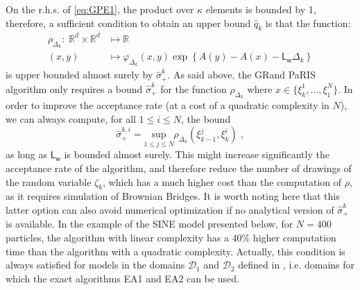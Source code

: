\documentclass[12pt]{article}
\newcommand{\eqsp}{\;}
\newcommand{\1}{\mathrm{1}}
\newcommand{\mw}{\mathsf{w}}%
\newcommand{\Lo}{\mathsf{L}}
\begin{document}
On the r.h.s. of \eqref{eq:GPE1}, the product over $\kappa$ elements is bounded by 1, therefore, a sufficient condition to obtain an upper bound  $\hat{q}_k$ is that the function:
\begin{align}
\rho_{\Delta_k}:\eqsp\mathbb{R}^d\times \mathbb{R}^d &\mapsto \mathbb{R}\nonumber\\
(x,y)&\mapsto \varphi_{\Delta_k}(x,y) \exp \left\{A(y) - A(x)- \Lo_\mw\Delta_k \right\}\label{eq:rho:func}
\end{align}
is upper bounded almost surely by $\hat{\sigma}_+^k$.
As said above, the GRand PaRIS algorithm only requires a bound $\hat{\sigma}_+^k$ for the function $\rho_{\Delta_k}$ where $x \in \{\xi_{k}^1,\dots,\xi_{1}^N\}$. In order to improve the acceptance rate (at a cost of a quadratic complexity in $N$), we can always compute, for all $1\le i\le N$, the bound 
\begin{equation}
\hat{\sigma}_{+}^{k,i}= \underset{1 \le j\le N}{\text{sup}}\rho_{\Delta_k}(\xi_{k-1}^j,\xi_k^i)\eqsp, \label{eq:quadr:bound}
\end{equation}
as long as $\Lo_\mw$ is bounded almost surely. This might increase significantly the acceptance rate of the algorithm, and therefore reduce the number of drawings of the random variable $\zeta_k$, which has a much higher cost than the computation of $\rho$, as it requires simulation of Brownian Bridges. It is worth noting here that this latter option can also avoid numerical optimization if no analytical version of $\hat{\sigma}_+^k$ is available. In the example of the SINE model presented below, for $N=400$ particles, the algorithm with linear complexity  has a 40\% higher computation time than the algorithm with a quadratic complexity. Actually, this condition is always satisfied for models in the domains $\mathcal{D}_1$ and $\mathcal{D}_2$ defined in \cite{beskos:papaspiliopoulos:roberts:fearnhead:2006}, i.e. domains for which the exact algorithms EA1 and EA2 can be used. 
\end{document}
